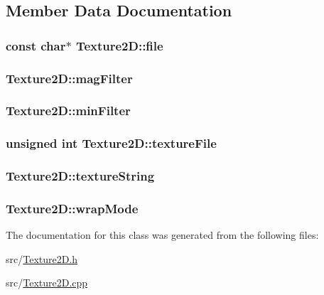 \subsection{Member Data Documentation}
\hypertarget{class_texture2_d_aae9361861138f81757c22940b043cf9e}{
\subsubsection[{file}]{\setlength{\rightskip}{0pt plus 5cm}const char$\ast$ Texture2\-D\-::file}}\label{class_texture2_d_aae9361861138f81757c22940b043cf9e}
\hypertarget{class_texture2_d_a0d7a02206c0dc417044c3304d09b3418}{
\subsubsection[{mag\-Filter}]{ Texture2\-D\-::mag\-Filter}}\label{class_texture2_d_a0d7a02206c0dc417044c3304d09b3418}
\hypertarget{class_texture2_d_afc3705719e253116fbf3d58826f2a9bd}{
\subsubsection[{min\-Filter}]{ Texture2\-D\-::min\-Filter}}\label{class_texture2_d_afc3705719e253116fbf3d58826f2a9bd}
\hypertarget{class_texture2_d_a671630108ecbc03195315646088d6c62}{
\subsubsection[{texture\-File}]{\setlength{\rightskip}{0pt plus 5cm}unsigned {\bf int} Texture2\-D\-::texture\-File}}\label{class_texture2_d_a671630108ecbc03195315646088d6c62}
\hypertarget{class_texture2_d_a7e43deea5770a3bee8959cb1cce9d2b7}{
\subsubsection[{texture\-String}]{ Texture2\-D\-::texture\-String}}\label{class_texture2_d_a7e43deea5770a3bee8959cb1cce9d2b7}
\hypertarget{class_texture2_d_a4ac23b61dbdfaca415c469f2b9b52d84}{
\subsubsection[{wrap\-Mode}]{ Texture2\-D\-::wrap\-Mode}}\label{class_texture2_d_a4ac23b61dbdfaca415c469f2b9b52d84}


The documentation for this class was generated from the following files\-:\begin{DoxyCompactItemize}
\item 
src/\hyperlink{_texture2_d_8h}{Texture2\-D.\-h}\item 
src/\hyperlink{_texture2_d_8cpp}{Texture2\-D.\-cpp}\end{DoxyCompactItemize}
